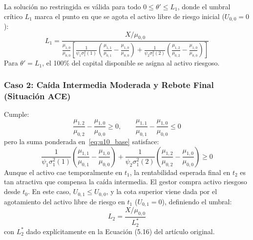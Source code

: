\documentclass[11pt,a4paper]{report}
\numberwithin{equation}{chapter}
\begin{document}
La solución no restringida es válida para todo $0 \le \theta' \le L_1$, donde el umbral crítico $L_1$ marca el punto en que se agota el activo libre de riesgo inicial ($U_{0,0} = 0$):
\begin{equation}
    \boxed{L_1 = \frac{X / \mu_{0,0}}{\frac{\mu_{1,0}}{\mu_{0,0}} \left[ \frac{1}{\psi_1 \sigma_1^2(1)}\left( \frac{\mu_{1,1}}{\mu_{0,1}} - \frac{\mu_{1,0}}{\mu_{0,0}} \right) + \frac{1}{\psi_2 \sigma_1^2(2)}\left( \frac{\mu_{1,2}}{\mu_{0,2}} - \frac{\mu_{1,0}}{\mu_{0,0}} \right) \right]}}
\end{equation}
Para $\theta' = L_1$, el 100\% del capital disponible se asigna al activo riesgoso.

\subsubsection{Caso 2: Caída Intermedia Moderada y Rebote Final (Situación ACE)}
Cumple:
\begin{equation}
    \frac{\mu_{1,2}}{\mu_{0,2}} - \frac{\mu_{1,0}}{\mu_{0,0}} \ge 0, \qquad \frac{\mu_{1,1}}{\mu_{0,1}} - \frac{\mu_{1,0}}{\mu_{0,0}} \le 0
\end{equation}
pero la suma ponderada en~\eqref{eq:u10_base} satisface:
\begin{equation}
    \frac{1}{\psi_1 \sigma_1^2(1)}\left( \frac{\mu_{1,1}}{\mu_{0,1}} - \frac{\mu_{1,0}}{\mu_{0,0}} \right) + \frac{1}{\psi_2 \sigma_1^2(2)}\left( \frac{\mu_{1,2}}{\mu_{0,2}} - \frac{\mu_{1,0}}{\mu_{0,0}} \right) \ge 0
\end{equation}
Aunque el activo cae temporalmente en $t_1$, la rentabilidad esperada final en $t_2$ es tan atractiva que compensa la caída intermedia. El gestor compra activo riesgoso desde $t_0$. En este caso, $U_{0,1} \le U_{0,0}$, y la cota superior viene dada por el agotamiento del activo libre de riesgo en $t_1$ ($U_{0,1} = 0$), definiendo el umbral:
\begin{equation}
    \boxed{L_2 = \frac{X / \mu_{0,0}}{L_2^*}}
\end{equation}
con $L_2^*$ dado explícitamente en la Ecuación (5.16) del artículo original.
\end{document}
